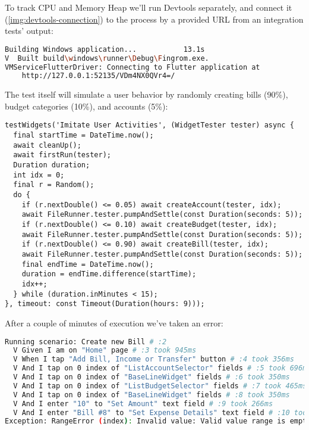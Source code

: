 
\noindent To track CPU and Memory Heap we'll run Devtools separately, and connect it (\cref{img:devtools-connection}) 
to the process by a provided URL from an integration tests' output:

\begin{lstlisting}[language=bash]
Building Windows application...           13.1s
V  Built build\windows\runner\Debug\Fingrom.exe.
VMServiceFlutterDriver: Connecting to Flutter application at 
    http://127.0.0.1:52135/VDm4NX0QVr4=/
\end{lstlisting}

\noindent The test itself will simulate a user behavior by randomly creating bills (90\%), budget categories (10\%),
and accounts (5\%): 

\begin{lstlisting}
testWidgets('Imitate User Activities', (WidgetTester tester) async {
  final startTime = DateTime.now();
  await cleanUp();
  await firstRun(tester);
  Duration duration;
  int idx = 0;
  final r = Random();
  do {
    if (r.nextDouble() <= 0.05) await createAccount(tester, idx);
    await FileRunner.tester.pumpAndSettle(const Duration(seconds: 5));
    if (r.nextDouble() <= 0.10) await createBudget(tester, idx);
    await FileRunner.tester.pumpAndSettle(const Duration(seconds: 5));
    if (r.nextDouble() <= 0.90) await createBill(tester, idx);
    await FileRunner.tester.pumpAndSettle(const Duration(seconds: 5));
    final endTime = DateTime.now();
    duration = endTime.difference(startTime);
    idx++;
  } while (duration.inMinutes < 15);
}, timeout: const Timeout(Duration(hours: 9)));
\end{lstlisting}

\noindent After a couple of minutes of execution we've taken an error:

\begin{lstlisting}[language=bash]
Running scenario: Create new Bill # :2
  V Given I am on "Home" page # :3 took 945ms
  V When I tap "Add Bill, Income or Transfer" button # :4 took 356ms
  V And I tap on 0 index of "ListAccountSelector" fields # :5 took 696ms
  V And I tap on 0 index of "BaseLineWidget" fields # :6 took 350ms
  V And I tap on 0 index of "ListBudgetSelector" fields # :7 took 465ms
  V And I tap on 0 index of "BaseLineWidget" fields # :8 took 350ms
  V And I enter "10" to "Set Amount" text field # :9 took 266ms
  V And I enter "Bill #8" to "Set Expense Details" text field # :10 took 266ms
Exception: RangeError (index): Invalid value: Valid value range is empty: -1
\end{lstlisting}

